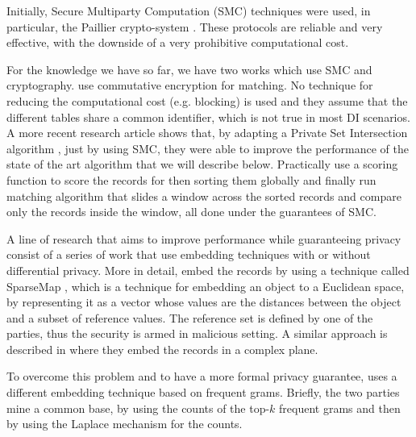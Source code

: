 \documentclass[12pt]{article}
\begin{document}
Initially, Secure Multiparty Computation (SMC) techniques were used, in particular, the Paillier crypto-system \cite*{paillier1999public}. 
These protocols are reliable and very effective, with the downside of a very prohibitive computational cost.

For the knowledge we have so far, we have two works which use SMC and cryptography. \cite*{agrawal_information_nodate} use commutative encryption for matching. No technique for reducing the computational cost (e.g. blocking) is used and they assume that the different tables share a common identifier, which is not true in most DI scenarios. A more recent research article \cite*{khurram_sfour_2020} shows that, by adapting a Private Set Intersection algorithm \cite*{huang2012private}, just by using SMC, they were able to improve the performance of the state of the art algorithm that we will describe below. Practically \cite*{khurram_sfour_2020} use a scoring function to score the records for then sorting them globally and finally run matching algorithm that slides a window across the sorted records and compare only the records inside the window, all done under the guarantees of SMC.

A line of research that aims to improve performance while guaranteeing privacy consist of a series of work that use embedding techniques with or without differential privacy. More in detail, \cite*{scannapieco_privacy_2007} embed the records by using a technique called SparseMap \cite*{sparsemap}, which is a technique for embedding an object to a Euclidean space, by representing it as a vector whose values are the distances between the object and a subset of reference values. The reference set is defined by one of the parties, thus the security is armed in malicious setting. A similar approach is described in \cite*{yakout_efficient_2009} where they embed the records in a complex plane.

To overcome this problem and to have a more formal privacy guarantee, \cite*{bonomi_frequent_2012} uses a different embedding technique based on frequent grams. Briefly, the two parties mine a common base, by using the counts of the top-$k$ frequent grams and then by using the Laplace mechanism \cite*{dwork_algorithmic_2013} for the counts.
\end{document}
